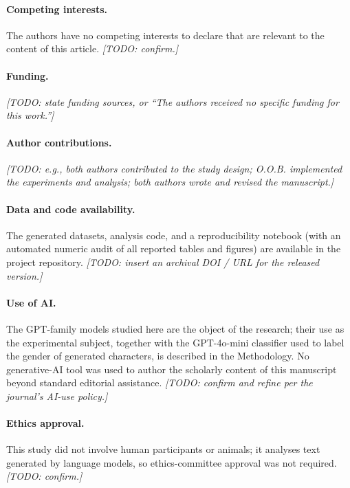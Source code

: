 \documentclass[12pt,a4paper]{article}
\begin{document}
\paragraph{Competing interests.} The authors have no competing interests to declare that
are relevant to the content of this article. \emph{[TODO: confirm.]}

\paragraph{Funding.} \emph{[TODO: state funding sources, or ``The authors received no
specific funding for this work.'']}

\paragraph{Author contributions.} \emph{[TODO: e.g., both authors contributed to the study
design; O.O.B. implemented the experiments and analysis; both authors wrote and revised the
manuscript.]}

\paragraph{Data and code availability.} The generated datasets, analysis code, and a
reproducibility notebook (with an automated numeric audit of all reported tables and
figures) are available in the project repository. \emph{[TODO: insert an archival DOI / URL
for the released version.]}

\paragraph{Use of AI.} The GPT-family models studied here are the object of the research;
their use as the experimental subject, together with the GPT-4o-mini classifier used to
label the gender of generated characters, is described in the Methodology. No generative-AI
tool was used to author the scholarly content of this manuscript beyond standard editorial
assistance. \emph{[TODO: confirm and refine per the journal's AI-use policy.]}

\paragraph{Ethics approval.} This study did not involve human participants or animals; it
analyses text generated by language models, so ethics-committee approval was not required.
\emph{[TODO: confirm.]}


\end{document}
